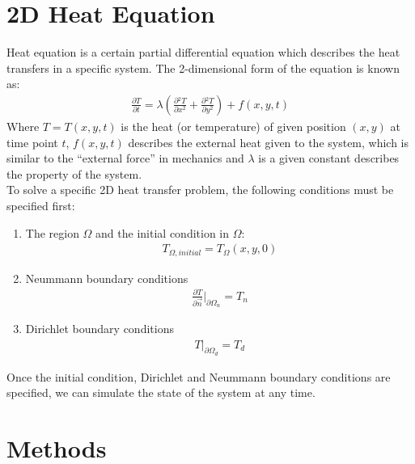 \documentclass[conference]{IEEEtran}
\begin{document}
\section{2D Heat Equation}
Heat equation is a certain partial differential equation which describes the heat transfers in a specific system. 
The 2-dimensional form of the equation is known as:
\begin{align}\nonumber
    \frac{\partial{T}}{\partial{t}} = \lambda(\frac{\partial {^2 T}}{\partial{x^2}} + \frac{\partial {^2 T}}{\partial{y^2}}) + f(x, y, t)
\end{align}
Where $T = T(x, y, t)$ is the heat (or temperature) of given position $(x, y)$ at time point $t$, 
$f(x, y, t)$ describes the external heat given to the system, which is similar to the ``external force'' 
in mechanics and $\lambda$ is a given constant describes the property of the system.\\
To solve a specific 2D heat transfer problem, the following conditions must be specified first:
\begin{enumerate}
    \item The region $\Omega$ and the initial condition in $\Omega$:
        \begin{align}\nonumber T_{\Omega, initial} = T_{\Omega}(x, y, 0) \end{align}
    \item Neummann boundary conditions
        \begin{align}\nonumber \frac{\partial{T}}{\partial{\vec{n}}}\big |_{\partial{\Omega_n}} = T_{n} \end{align}
    \item Dirichlet boundary conditions
        \begin{align}\nonumber T\big| _{\partial{\Omega_d}} = T_{d} \end{align}
\end{enumerate}
Once the initial condition, Dirichlet and Neummann boundary conditions are specified, 
we can simulate the state of the system at any time.


\section{Methods}
\end{document}
